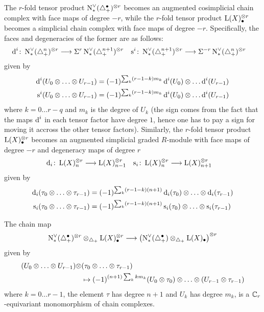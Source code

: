 The $r$-fold tensor product $\operatorname{N}^\vee_{*}(\triangle_{+}^\bullet)^{ \otimes  r}$ becomes an augmented cosimplicial chain complex with face maps of degree $-r$, while the $r$-fold tensor product $\operatorname{L}(X)_\bullet^{ \otimes  r}$ becomes a simplicial chain complex with face maps of degree $-r$. Specifically, the faces and degeneracies of the former are as follows:
\begin{align*}
	\operatorname{d}^i \colon  \operatorname{N}^\vee_{*}(\triangle_{+}^n)^{ \otimes  r}&\longrightarrow \Sigma^{r}\operatorname{N}^\vee_{*}(\triangle_{+}^{n+1})^{ \otimes  r}
	&
	\operatorname{s}^i \colon  \operatorname{N}^\vee_{*}(\triangle_{+}^{n+1})^{ \otimes  r}&\longrightarrow \Sigma^{-r}\operatorname{N}^\vee_{*}(\triangle_{+}^{n})^{ \otimes  r}
\end{align*}
given by
\begin{align*}
	\operatorname{d}^i(U_0 \otimes  \ldots \otimes  U_{r-1}) &= (-1)^{\sum_k (r-1-k)m_k}\operatorname{d}^i(U_0) \otimes  \ldots \operatorname{d}^i(U_{r-1})
	\\
	\operatorname{s}^i(U_0 \otimes  \ldots \otimes  U_{r-1}) &= (-1)^{\sum_k (r-1-k)m_k}\operatorname{d}^i(U_0) \otimes  \ldots \operatorname{d}^i(U_{r-1})
\end{align*}
where $k = 0\ldots r-q$ and $m_k$ is the degree of $U_k$ (the sign comes from the fact that the maps $\operatorname{d}^i$ in each tensor factor have degree $1$, hence one has to pay a sign for moving it accross the other tensor factors). Similarly, the $r$-fold tensor product $\operatorname{L}(X)^{ \otimes  r}_{\bullet}$ becomes an augmented simplicial graded $R$-module with face maps of degree $-r$ and degeneracy maps of degree $r$
\begin{align*}
	\operatorname{d}_i \colon  \operatorname{L}(X)_n^{ \otimes  r} &\longrightarrow \operatorname{L}(X)_{n-1}^{ \otimes  r}
	&
	\operatorname{s}_i \colon  \operatorname{L}(X)_n^{ \otimes  r} &\longrightarrow \operatorname{L}(X)_{n+1}^{ \otimes  r}
\end{align*}
given by
\begin{align*}
	\operatorname{d}_i(\tau_0 \otimes  \ldots \otimes  \tau_{r-1}) &= (-1)^{\sum_k (r-1-k)(n+1)} \operatorname{d}_i(\tau_0) \otimes  \ldots  \otimes  \operatorname{d}_i(\tau_{r-1})
\\
	\operatorname{s}_i(\tau_0 \otimes  \ldots \otimes  \tau_{r-1}) &= (-1)^{\sum_k (r-1-k)(n+1)} \operatorname{s}_i(\tau_0) \otimes  \ldots  \otimes  \operatorname{s}_i(\tau_{r-1})
	\end{align*}
\begin{lemma}\label{lemma:3}
	The chain map
	\[\operatorname{N}^\vee_{*}(\triangle_{+}^\bullet)^{ \otimes  r} \otimes _{\triangle_{+}} \operatorname{L}(X)_\bullet^{ \otimes  r}\longrightarrow \left(\operatorname{N}^\vee_{*}(\triangle_{+}^\bullet) \otimes _{\triangle_{+}} \operatorname{L}(X)_\bullet\right)^{ \otimes  r}\]
	given by
	\begin{align*}
		(U_0 \otimes  \ldots \otimes  U_{r-1}) \otimes  &(\tau_0 \otimes \ldots \otimes  \tau_{r-1})
	\\
  &\mapsto (-1)^{(n+1)\sum_{k} km_k}(U_0 \otimes \tau_0) \otimes  \ldots \otimes  (U_{r-1} \otimes  \tau_{r-1})
	\end{align*}
where $k=0\ldots r-1$, the element $\tau$ has degree $n+1$ and $U_k$ has degree $m_k$, is a $\mathbb{C}_r$-equivariant monomorphism of chain complexes.
\end{lemma}
